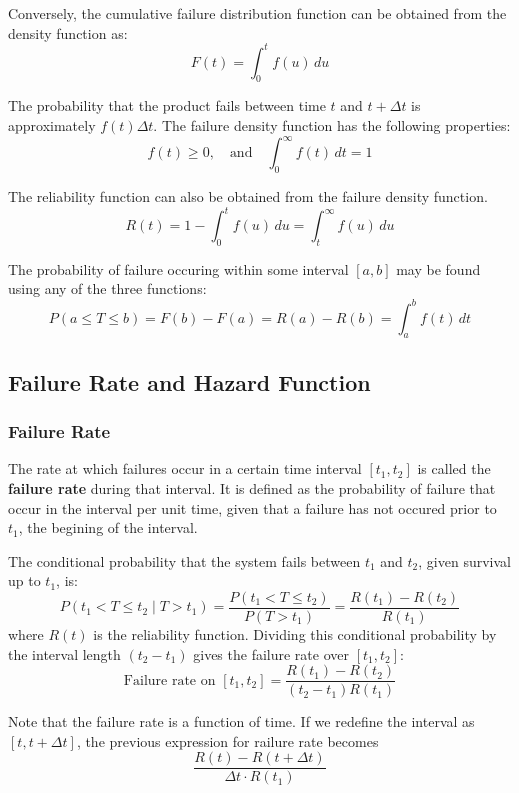 \documentclass[twoside]{book}
\begin{document}
Conversely, the cumulative failure distribution function can be obtained from the density function as:
\begin{equation*}
F(t) = \int_0^{t} f(u)\,du
\end{equation*}

The probability that the product fails between time $t$ and $t + \Delta t$ is approximately $f(t)\Delta t$. The failure density function has the following properties:
\begin{equation*}
f(t) \geq 0, \quad \text{and} \quad \int_0^{\infty} f(t)\,dt = 1
\end{equation*}

The reliability function can also be obtained from the failure density function.
$$R(t) = 1 - \int_0^{t} f(u)\,du = \int_t^{\infty} f(u)\,du$$

The probability of failure occuring within some interval $[a,b]$ may be found using any of the three functions:
$$P(a \leq T \leq b) = F(b) - F(a) = R(a) - R(b) =  \int_a^{b} f(t)\,dt$$

\subsection{Failure Rate and Hazard Function}

\subsubsection{Failure Rate}

The rate at which failures occur in a certain time interval $[t_1, t_2]$ is called the \textbf{failure rate} during that interval. It is defined as the probability of failure that occur in the interval per unit time, given that a failure has not occured prior to $t_1$, the begining of the interval.

The conditional probability that the system fails between $t_1$ and $t_2$, given survival up to $t_1$, is:
\[
P(t_1 < T \leq t_2 \mid T > t_1) = \frac{P(t_1 < T \leq t_2)}{P(T > t_1)} = \dfrac{R(t_1) - R(t_2)}{R(t_1)}
\]
where $R(t)$ is the reliability function. Dividing this conditional probability by the interval length $(t_2 - t_1)$ gives the {failure rate} over $[t_1, t_2]$:
\[
\text{Failure rate on } [t_1, t_2] = \dfrac{R(t_1) - R(t_2)}{(t_2 - t_1) R(t_1)}
\]

Note that the failure rate is a function of time. If we redefine the interval as $[t, t+\Delta t]$, the previous expression for railure rate becomes
\[
\dfrac{R(t) - R(t+\Delta t)}{\Delta t \cdot R(t_1)}
\]
\end{document}

